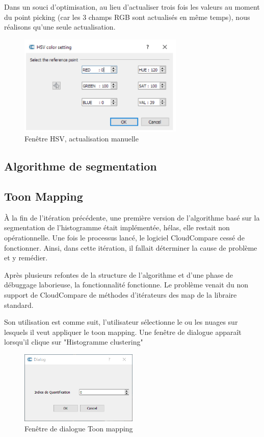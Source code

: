 \documentclass[12pt,titlepage,french]{article}
\begin{document}
Dans un souci d'optimisation, au lieu d'actualiser trois fois les valeurs au moment du point picking (car les 3 champs RGB sont actualisés en même temps), nous réalisons qu'une seule actualisation.

\begin{figure}[H]
 \caption{\label{} Fenêtre HSV, actualisation manuelle}
 \begin{center}
 \includegraphics[width=0.7\textwidth]{./img/hsv.PNG}
  \end{center}
\end{figure}

\subsection{Algorithme de segmentation}

\subsection{Toon Mapping}

À la fin de l'itération précédente, une première version de l'algorithme basé sur la segmentation de l'histogramme était implémentée, hélas, elle restait non opérationnelle. Une fois le processus lancé, le logiciel CloudCompare cessé de fonctionner. Ainsi, dans cette itération, il fallait déterminer la cause de problème et y remédier.

Après plusieurs refontes de la structure de l'algorithme et d'une phase de débuggage laborieuse, la fonctionnalité fonctionne. Le problème venait du non support de CloudCompare de méthodes d'itérateurs des map de la libraire standard.

Son utilisation est comme suit, l'utilisateur sélectionne le ou les nuages sur lesquels il veut appliquer le toon mapping. Une fenêtre de dialogue apparaît lorsqu'il clique sur "Histogramme clustering"

\begin{figure}[H]
 \caption{\label{} Fenêtre de dialogue Toon mapping}
 \begin{center}
 \includegraphics[width=0.5\textwidth]{./img/ToonMappingDialog.PNG}
  \end{center}
\end{figure}
\end{document}
